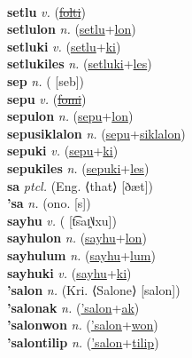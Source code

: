  \label{setak} \\
\textbf{setlu} \textit{v.} (\hyperref[folti]{\sout{folti}})
 \label{setlu} \\
\textbf{setlulon} \textit{n.} (\hyperref[setlu]{setlu}+\hyperref[lon]{lon})
 \label{setlulon} \\
\textbf{setluki} \textit{v.} (\hyperref[setlu]{setlu}+\hyperref[ki]{ki})
 \label{setluki} \\
\textbf{setlukiles} \textit{n.} (\hyperref[setluki]{setluki}+\hyperref[les]{les})
 \label{setlukiles} \\
\textbf{sep} \textit{n.} ( [seb])
 \label{sep} \\
\textbf{sepu} \textit{v.} (\hyperref[fomi]{\sout{fomi}})
 \label{sepu} \\
\textbf{sepulon} \textit{n.} (\hyperref[sepu]{sepu}+\hyperref[lon]{lon})
 \label{sepulon} \\
\textbf{sepusiklalon} \textit{n.} (\hyperref[sepu]{sepu}+\hyperref[siklalon]{siklalon})
 \label{sepusiklalon} \\
\textbf{sepuki} \textit{v.} (\hyperref[sepu]{sepu}+\hyperref[ki]{ki})
 \label{sepuki} \\
\textbf{sepukiles} \textit{n.} (\hyperref[sepuki]{sepuki}+\hyperref[les]{les})
 \label{sepukiles} \\
\textbf{sa} \textit{ptcl.} (Eng. ⟨that⟩ [ðæt])
 \label{sa} \\
\textbf{'sa} \textit{n.} (ono. [s])
 \label{'sa} \\
\textbf{sayhu} \textit{v.} ( [t͡saɪ̯˥˩xu])
 \label{sayhu} \\
\textbf{sayhulon} \textit{n.} (\hyperref[sayhu]{sayhu}+\hyperref[lon]{lon})
 \label{sayhulon} \\
\textbf{sayhulum} \textit{n.} (\hyperref[sayhu]{sayhu}+\hyperref[lum]{lum})
 \label{sayhulum} \\
\textbf{sayhuki} \textit{v.} (\hyperref[sayhu]{sayhu}+\hyperref[ki]{ki})
 \label{sayhuki} \\
\textbf{'salon} \textit{n.} (Kri. ⟨Salone⟩ [salon])
 \label{'salon} \\
\textbf{'salonak} \textit{n.} (\hyperref['salon]{'salon}+\hyperref[ak]{ak})
 \label{'salonak} \\
\textbf{'salonwon} \textit{n.} (\hyperref['salon]{'salon}+\hyperref[won]{won})
 \label{'salonwon} \\
\textbf{'salontilip} \textit{n.} (\hyperref['salon]{'salon}+\hyperref[tilip]{tilip})
 \label{'salontilip} \\
